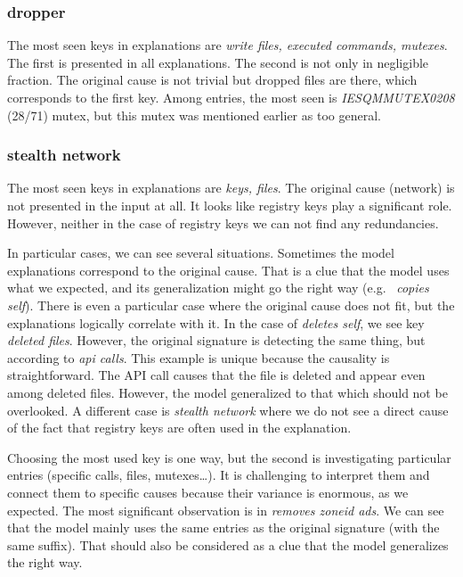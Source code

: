 \subsubsection*{dropper}
The most seen keys in explanations are \emph{write files, executed commands, mutexes}. The first is presented in all explanations. The second is not only in negligible fraction. The original cause is not trivial but dropped files are there, which corresponds to the first key. Among entries, the most seen is \emph{IESQMMUTEX0208} (28/71) mutex, but this mutex was mentioned earlier as too general.

\subsubsection*{stealth network}
The most seen keys in explanations are \emph{keys, files}. The original cause (network) is not presented in the input at all. It looks like registry keys play a significant role. However, neither in the case of registry keys we can not find any redundancies.

\hfill \break

In particular cases, we can see several situations. Sometimes the model explanations correspond to the original cause. That is a clue that the model uses what we expected, and its generalization might go the right way (e.g. \ \emph{copies self}). There is even a particular case where the original cause does not fit, but the explanations logically correlate with it. In the case of \emph{deletes self}, we see key \emph{deleted files}. However, the original signature is detecting the same thing, but according to \emph{api calls}. This example is unique because the causality is straightforward. The API call causes that the file is deleted and appear even among deleted files. However, the model generalized to that which should not be overlooked. A different case is \emph{stealth network} where we do not see a direct cause of the fact that registry keys are often used in the explanation.

Choosing the most used key is one way, but the second is investigating particular entries (specific calls, files, mutexes\dots). It is challenging to interpret them and connect them to specific causes because their variance is enormous, as we expected. The most significant observation is in \emph{removes zoneid ads}. We can see that the model mainly uses the same entries as the original signature (with the same suffix). That should also be considered as a clue that the model generalizes the right way.

